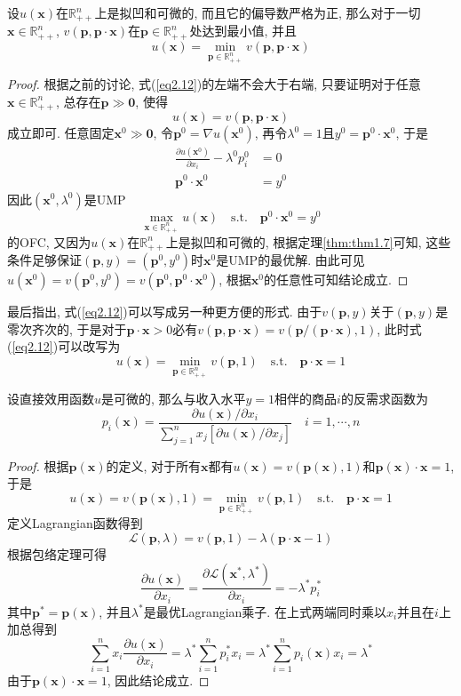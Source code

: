 \documentclass[cn, 12pt, math=mtpro2, bibstyle=apa, blue, twocol]{elegantbook}
\newcommand{\R}{\mathbb{R}}
\newcommand{\p}{\mathbf{p}}
\newcommand{\x}{\mathbf{x}}
\begin{document}
\begin{theorem}
  设$u(\x)$在$\R_{++}^n$上是拟凹和可微的, 而且它的偏导数严格为正, 那么对于一切$\x\in\R_{++}^n$, $v(\p,\p\cdot\x)$在$\p\in\R_{++}^n$处达到最小值, 并且
  \begin{equation}\label{eq2.12}
    u(\x)=\min_{\p\in\R_{++}^n}v(\p,\p\cdot\x)
  \end{equation}
\end{theorem}
\begin{proof}
  根据之前的讨论, 式(\ref{eq2.12})的左端不会大于右端, 只要证明对于任意$\x\in\R_{++}^n$, 总存在$\p\gg\mathbf{0}$, 使得
  \begin{equation}\label{eq2.13}
    u(\x)=v(\p,\p\cdot\x)
  \end{equation}
  成立即可. 任意固定$\x^0\gg\mathbf{0}$, 令$\p^0=\nabla u(\x^0)$, 再令$\lambda^0=1$且$y^0=\p^0\cdot\x^0$, 于是
  \begin{align*}
  \frac{\partial u(\x^0)}{\partial x_i}-\lambda^0p_i^0&=0 \\
  \p^0\cdot\x^0&=y^0
  \end{align*}
  因此$(\x^0,\lambda^0)$是UMP
  $$\max_{\x\in\R_{++}^n}u(\x)\quad\text{s.t.}\quad\p^0\cdot\x^0=y^0$$
  的OFC, 又因为$u(\x)$在$\R_{++}^n$上是拟凹和可微的, 根据定理\ref{thm:thm1.7}可知, 这些条件足够保证$(\p,y)=(\p^0,y^0)$时$\x^0$是UMP的最优解. 由此可见$u(\x^0)=v(\p^0,y^0)=v(\p^0,\p^0\cdot\x^0)$, 根据$\x^0$的任意性可知结论成立.
\end{proof}

最后指出, 式(\ref{eq2.12})可以写成另一种更方便的形式. 由于$v(\p,y)$关于$(\p,y)$是零次齐次的, 于是对于$\p\cdot\x>0$必有$v(\p,\p\cdot\x)=v(\p/(\p\cdot\x),1)$, 此时式(\ref{eq2.12})可以改写为
\begin{equation}\label{eq2.14}
  u(\x)=\min_{\p\in\R_{++}^n}v(\p,1)\quad\text{s.t.}\quad\p\cdot\x=1
\end{equation}
\begin{theorem}
  设直接效用函数$u$是可微的, 那么与收入水平$y=1$相伴的商品$i$的反需求函数为
  $$p_i(\x)=\frac{\partial u(\x)/\partial x_i}{\sum_{j=1}^{n}x_j[\partial u(\x)/\partial x_j]}\quad i=1,\cdots,n$$
\end{theorem}
\begin{proof}
  根据$\p(\x)$的定义, 对于所有$\x$都有$u(\x)=v(\p(\x),1)$和$\p(\x)\cdot\x=1$, 于是
  \begin{equation}\label{eq2.15}
    u(\x)=v(\p(\x),1)=\min_{\p\in\R_{++}^n}v(\p,1)\quad\text{s.t.}\quad\p\cdot\x=1
  \end{equation}
  定义Lagrangian函数得到
  $$\mathcal{L}(\p,\lambda)=v(\p,1)-\lambda(\p\cdot\x-1)$$
  根据包络定理可得
  $$\frac{\partial u(\x)}{\partial x_i}=\frac{\partial\mathcal{L}(\x^\ast,\lambda^\ast)}{\partial x_i}=-\lambda^\ast p_i^\ast$$
  其中$\p^\ast=\p(\x)$, 并且$\lambda^\ast$是最优Lagrangian乘子. 在上式两端同时乘以$x_i$并且在$i$上加总得到
  $$\sum_{i=1}^{n}x_i\frac{\partial u(\x)}{\partial x_i}=\lambda^\ast\sum_{i=1}^{n}p_i^\ast x_i=\lambda^\ast\sum_{i=1}^{n}p_i(\x)x_i=\lambda^\ast$$
  由于$\p(\x)\cdot\x=1$, 因此结论成立.
\end{proof}
\end{document}
